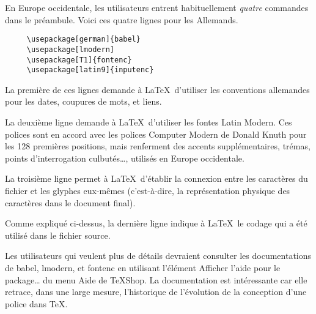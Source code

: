 \documentclass[11pt,french]{article}
\newcommand{\TS}{\textsf{\TeX Shop}}
\newcommand{\cmd}[1]{\textsf{#1}}
\begin{document}
En Europe occidentale, les utilisateurs entrent habituellement \emph{quatre} commandes dans le préambule. Voici ces quatre lignes pour les Allemands.
\begin{verbatim}
     \usepackage[german]{babel}
     \usepackage[lmodern]
     \usepackage[T1]{fontenc}
     \usepackage[latin9]{inputenc}
\end{verbatim}

La première de ces lignes demande à \LaTeX\ d'utiliser les conventions allemandes pour les dates, coupures de mots, et liens.

La deuxième ligne demande à \LaTeX\ d'utiliser les fontes Latin Modern. Ces polices sont en accord avec les polices Computer Modern de Donald Knuth pour les 128 premières positions, mais renferment des accents supplémentaires, trémas, points d'interrogation culbutés…, utilisés en Europe occidentale.

La troisième ligne permet à \LaTeX\ d'établir la connexion entre les caractères du fichier et les glyphes eux-mêmes (c'est-à-dire, la représentation physique des caractères dans le document final).

Comme expliqué ci-dessus, la dernière ligne indique à \LaTeX\ le codage qui a été utilisé dans le fichier source.

Les utilisateurs qui veulent plus de détails devraient consulter les documentations de \cmd{babel}, \cmd{lmodern}, et \cmd{fontenc} en utilisant l'élément \cmd{Afficher l'aide pour le package…} du menu \cmd{Aide} de \TS. La documentation est intéressante car elle retrace, dans une large mesure, l'historique de l'évolution de la conception d'une police dans \TeX.
\end{document}
